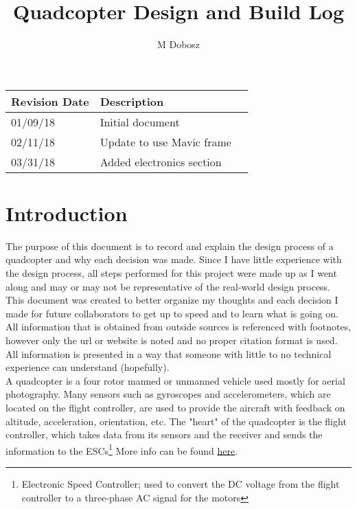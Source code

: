\documentclass[12pt]{article}
\title{Quadcopter Design and Build Log}
\author{M Dobosz}
\begin{document}
\begin{titlepage}
\vspace*{-4.5cm}
\hspace*{-4.1cm}
{\let\newpage\relax\maketitle}

\begin{table}[b]
\begin{center}
\begin{tabular}{| l | l | l |}
\hline
\textbf{Revision Date} & \textbf{Description} \\ \hline
01/09/18 & Initial document \\ \hline
02/11/18 & Update to use Mavic frame \\ \hline
03/31/18 & Added electronics section \\ \hline

\end{tabular}
\end{center}
\end{table}
\end{titlepage}


\pagebreak
\tableofcontents
\pagebreak

\section{Introduction}

The purpose of this document is to record and explain the design process of a quadcopter and why each decision was made. Since I have little experience with the design process, all steps performed for this project were made up as I went along and may or may not be representative of the real-world design process. This document was created to better organize my thoughts and each decision I made for future collaborators to get up to speed and to learn what is going on. All information that is obtained from outside sources is referenced with footnotes, however only the url or website is noted and no proper citation format is used. All information is presented in a way that someone with little to no technical experience can understand (hopefully).
\\

A quadcopter is a four rotor manned or unmanned vehicle used mostly for aerial photography. Many sensors such as gyroscopes and accelerometers, which are located on the flight controller, are used to provide the aircraft with feedback on altitude, acceleration, orientation, etc. The "heart" of the quadcopter is the flight controller, which takes data from its sensors and the receiver and sends the information to the ESCs\footnote{Electronic Speed Controller; used to convert the DC voltage from the flight controller to a three-phase AC signal for the motors} More info can be found \href{https://en.wikipedia.org/wiki/Quadcopter}{\color{cyan}here}.
\\
\end{document}
